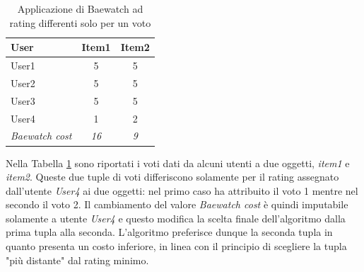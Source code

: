 \documentclass[letterpaper]{article}
\begin{document}
\begin{table}[h]
\centering
\begin{tabular}{|l|c|c|}
\hline
\textbf{User}          & \multicolumn{1}{l|}{\textbf{Item1}} & \multicolumn{1}{l|}{\textbf{Item2}} \\ \hline
User1                  & 5                                   & 5                                   \\ \hline
User2                  & 5                                   & 5                                   \\ \hline
User3                  & 5                                   & 5                                   \\ \hline
User4                  & 1                                   & 2                                   \\ \hline
\textit{Baewatch cost} & \textit{16}                         & \textit{9}                          \\ \hline
\end{tabular}
\caption{Applicazione di Baewatch ad rating differenti solo per un voto}
\label{table:2}
\end{table}

Nella Tabella \ref{table:2} sono riportati i voti dati da alcuni utenti a due oggetti, \emph{item1} e \emph{item2}. Queste due tuple di voti differiscono solamente per il rating assegnato dall'utente \emph{User4} ai due oggetti: nel primo caso ha attribuito il voto 1 mentre nel secondo il voto 2. Il cambiamento del valore \emph{Baewatch cost} è quindi imputabile solamente a utente \emph{User4} e questo modifica la scelta finale dell'algoritmo dalla prima tupla alla seconda. L'algoritmo preferisce dunque la seconda tupla in quanto presenta un costo inferiore, in linea con il principio di scegliere la tupla "più distante" dal rating minimo.
\end{document}
